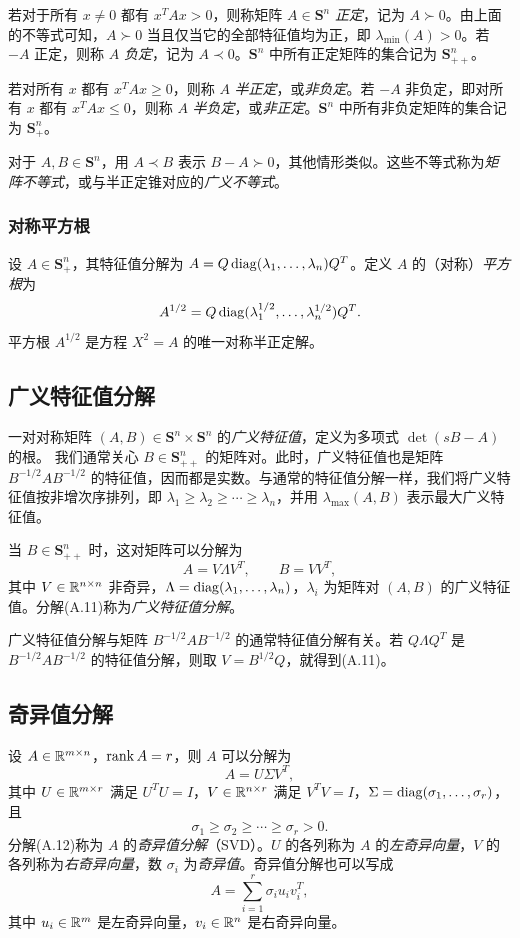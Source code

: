 若对于所有 $x\neq0$ 都有 $x^TAx>0$，则称矩阵 $A\in\mathbf S^n$ \emph{正定}，记为 $A\succ0$。由上面的不等式可知，$A\succ0$ 当且仅当它的全部特征值均为正，即 $\lambda_{\min}(A)>0$。若 $-A$ 正定，则称 $A$ \emph{负定}，记为 $A\prec0$。$\mathbf S^n$ 中所有正定矩阵的集合记为 $\mathbf S_{++}^n$。

若对所有 $x$ 都有 $x^TAx\geq0$，则称 $A$ \emph{半正定}，或\emph{非负定}。若 $-A$ 非负定，即对所有 $x$ 都有 $x^TAx\leq0$，则称 $A$ \emph{半负定}，或\emph{非正定}。$\mathbf S^n$ 中所有非负定矩阵的集合记为 $\mathbf S_+^n$。

对于 $A,B\in\mathbf S^n$，用 $A\prec B$ 表示 $B-A\succ0$，其他情形类似。这些不等式称为\emph{矩阵不等式}，或与半正定锥对应的\emph{广义不等式}。

\subsubsection*{对称平方根}
设 $A\in\mathbf S_+^n$，其特征值分解为 $A=Q\operatorname{diag}(\lambda_1,\ldots,\lambda_n)Q^T$。定义 $A$ 的（对称）\emph{平方根}为
\[
 A^{1/2}=Q\operatorname{diag}(\lambda_1^{1/2},\ldots,\lambda_n^{1/2})Q^T.
\]
平方根 $A^{1/2}$ 是方程 $X^2=A$ 的唯一对称半正定解。

\subsection{广义特征值分解}
一对对称矩阵 $(A,B)\in\mathbf S^n\times\mathbf S^n$ 的\emph{广义特征值}，定义为多项式 $\det(sB-A)$ 的根。
我们通常关心 $B\in\mathbf S_{++}^n$ 的矩阵对。此时，广义特征值也是矩阵 $B^{-1/2}AB^{-1/2}$ 的特征值，因而都是实数。与通常的特征值分解一样，我们将广义特征值按非增次序排列，即 $\lambda_1\geq\lambda_2\geq\cdots\geq\lambda_n$，并用 $\lambda_{\max}(A,B)$ 表示最大广义特征值。

当 $B\in\mathbf S_{++}^n$ 时，这对矩阵可以分解为
\begin{equation}
 A=V\Lambda V^T,\qquad B=VV^T,\tag{A.11}
\end{equation}
其中 $V\in\mathbb R^{n\times n}$ 非奇异，$\Lambda=\operatorname{diag}(\lambda_1,\ldots,\lambda_n)$，$\lambda_i$ 为矩阵对 $(A,B)$ 的广义特征值。分解(A.11)称为\emph{广义特征值分解}。

广义特征值分解与矩阵 $B^{-1/2}AB^{-1/2}$ 的通常特征值分解有关。若 $Q\Lambda Q^T$ 是 $B^{-1/2}AB^{-1/2}$ 的特征值分解，则取 $V=B^{1/2}Q$，就得到(A.11)。

\subsection{奇异值分解}
设 $A\in\mathbb R^{m\times n}$，$\operatorname{rank} A=r$，则 $A$ 可以分解为
\begin{equation}
 A=U\Sigma V^T,\tag{A.12}
\end{equation}
其中 $U\in\mathbb R^{m\times r}$ 满足 $U^TU=I$，$V\in\mathbb R^{n\times r}$ 满足 $V^TV=I$，$\Sigma=\operatorname{diag}(\sigma_1,\ldots,\sigma_r)$，且
\[
 \sigma_1\geq\sigma_2\geq\cdots\geq\sigma_r>0.
\]
分解(A.12)称为 $A$ 的\emph{奇异值分解}（SVD）。$U$ 的各列称为 $A$ 的\emph{左奇异向量}，$V$ 的各列称为\emph{右奇异向量}，数 $\sigma_i$ 为\emph{奇异值}。奇异值分解也可以写成
\[
 A=\sum_{i=1}^r\sigma_i u_iv_i^T,
\]
其中 $u_i\in\mathbb R^m$ 是左奇异向量，$v_i\in\mathbb R^n$ 是右奇异向量。

